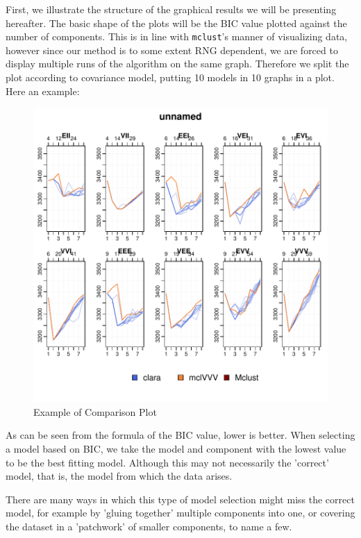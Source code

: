 First, we illustrate the structure of the graphical results we will be 
presenting hereafter. The basic shape of the plots will be the BIC value 
plotted against the number of components. This is in line with {\tt mclust}'s
manner of visualizing data, however since our method is to some extent RNG 
dependent, we are forced to display multiple runs of the algorithm on the same
graph. Therefore we split the plot according to covariance model, putting 10
models in 10 graphs in a plot. Here an example:


\begin{figure}[h!]
    \begin{Rgraph}[0.9]
\includegraphics{chapter3-bicplotdemoplot}
    \caption{Example of Comparison Plot}
    \label{fig:ExPlot}
    \end{Rgraph}
\end{figure}

As can be seen from the formula of the BIC value, lower is better. When 
selecting a model based on BIC, we take the model and component with the 
lowest value to be the best fitting model. Although this may not necessarily
the 'correct' model, that is, the model from which the data arises.

There are many ways in which this type of model selection might miss the 
correct model, for example by 'gluing together' multiple components into one,
or covering the dataset in a 'patchwork' of smaller components, to name a few.

